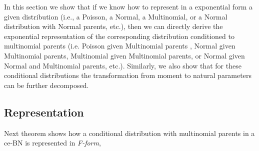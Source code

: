 \documentclass[11pt, oneside]{article}   	%
\numberwithin{figure}{section}
\numberwithin{equation}{section}
\numberwithin{table}{section}
\theoremstyle{definition}
\begin{document}
In this section we show that if we know how to represent in a exponential form a given distribution (i.e., a Poisson, a Normal, a Multinomial, or a Normal distribution with Normal parents, etc.), then we can directly derive the exponential representation of the corresponding distribution conditioned to multinomial parents (i.e. Poisson given Multinomial parents , Normal given Multinomial parents, Multinomial given Multinomial parents, or Normal given Normal and Multinomial parents, etc.).  Similarly, we also show that for these conditional distributions the transformation from moment to natural parameters can be further decomposed. 

\subsection{Representation} \label{Section:CD_With_MParents:Representation}


Next theorem shows how a conditional distribution with multinomial parents in a ce-BN is represented in \textit{F-form}, 
\end{document}
